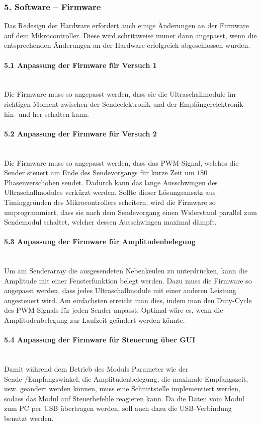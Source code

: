 \documentclass[10pt,a4paper,oneside]{99_fhnwreport}
\begin{document}
\subsubsection*{5. Software -- Firmware}
Das Redesign der Hardware erfordert auch einige Änderungen an der Firmware auf dem Mikrocontroller. Diese wird schrittweise immer dann angepasst, wenn die entsprechenden Änderungen an der Hardware erfolgreich abgeschlossen wurden.

\paragraph{5.1 Anpassung der Firmware für Versuch 1}\\
Die Firmware muss so angepasst werden, dass sie die Ultraschallmodule im richtigen Moment zwischen der Sendeelektronik und der Empfängerelektronik hin- und her schalten kann.

\paragraph{5.2 Anpassung der Firmware für Versuch 2}\\
Die Firmware muss so angepasst werden, dass das PWM-Signal, welches die Sender steuert am Ende des Sendevorgangs für kurze Zeit um $180 \mathrm{^{\circ}}$ Phasenverschoben sendet. Dadurch kann das lange Ausschwingen des Ultraschallmodules verkürzt werden. Sollte dieser Lösungsansatz aus Timinggründen des Mikrocontrollers scheitern, wird die Firmware so umprogrammiert, dass sie nach dem Sendevorgang einen Widerstand parallel zum Sendemodul schaltet, welcher dessen Ausschwingen maximal dämpft.

\paragraph{5.3 Anpassung der Firmware für Amplitudenbelegung}\\
Um am Senderarray die ausgesendeten Nebenkeulen zu unterdrücken, kann die Amplitude mit einer Fensterfunktion belegt werden. Dazu muss die Firmware so angepasst werden, dass jedes Ultraschallmodule mit einer anderen Leistung angesteuert wird. Am einfachsten erreicht man dies, indem man den Duty-Cycle des PWM-Signals für jeden Sender anpasst. Optimal wäre es, wenn die Amplitudenbelegung zur Laufzeit geändert werden könnte.

\paragraph{5.4 Anpassung der Firmware für Steuerung über GUI}\\
Damit während dem Betrieb des Moduls Parameter wie der Sende-/Empfangswinkel, die Amplitudenbelegung, die maximale Empfangszeit, usw. geändert werden können, muss eine Schnittstelle implementiert werden, sodass das Modul auf Steuerbefehle reagieren kann. Da die Daten vom Modul zum PC per USB übertragen werden, soll auch dazu die USB-Verbindung benutzt werden.
\end{document}
